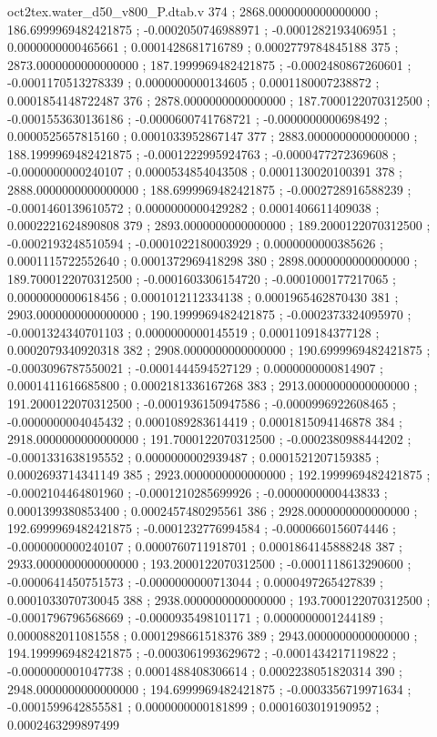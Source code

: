 \begin{filecontents}[overwrite]{oct2tex.water_d50_v800_P.dtab.v}
374 ; 2868.0000000000000000 ; 186.6999969482421875 ; -0.0002050746988971 ; -0.0001282193406951 ; 0.0000000000465661 ; 0.0001428681716789 ; 0.0002779784845188
375 ; 2873.0000000000000000 ; 187.1999969482421875 ; -0.0002480867260601 ; -0.0001170513278339 ; 0.0000000000134605 ; 0.0001180007238872 ; 0.0001854148722487
376 ; 2878.0000000000000000 ; 187.7000122070312500 ; -0.0001553630136186 ; -0.0000600741768721 ; -0.0000000000698492 ; 0.0000525657815160 ; 0.0001033952867147
377 ; 2883.0000000000000000 ; 188.1999969482421875 ; -0.0001222995924763 ; -0.0000477272369608 ; -0.0000000000240107 ; 0.0000534854043508 ; 0.0001130020100391
378 ; 2888.0000000000000000 ; 188.6999969482421875 ; -0.0002728916588239 ; -0.0001460139610572 ; 0.0000000000429282 ; 0.0001406611409038 ; 0.0002221624890808
379 ; 2893.0000000000000000 ; 189.2000122070312500 ; -0.0002193248510594 ; -0.0001022180003929 ; 0.0000000000385626 ; 0.0001115722552640 ; 0.0001372969418298
380 ; 2898.0000000000000000 ; 189.7000122070312500 ; -0.0001603306154720 ; -0.0001000177217065 ; 0.0000000000618456 ; 0.0001012112334138 ; 0.0001965462870430
381 ; 2903.0000000000000000 ; 190.1999969482421875 ; -0.0002373324095970 ; -0.0001324340701103 ; 0.0000000000145519 ; 0.0001109184377128 ; 0.0002079340920318
382 ; 2908.0000000000000000 ; 190.6999969482421875 ; -0.0003096787550021 ; -0.0001444594527129 ; 0.0000000000814907 ; 0.0001411616685800 ; 0.0002181336167268
383 ; 2913.0000000000000000 ; 191.2000122070312500 ; -0.0001936150947586 ; -0.0000996922608465 ; -0.0000000004045432 ; 0.0001089283614419 ; 0.0001815094146878
384 ; 2918.0000000000000000 ; 191.7000122070312500 ; -0.0002380988444202 ; -0.0001331638195552 ; 0.0000000002939487 ; 0.0001521207159385 ; 0.0002693714341149
385 ; 2923.0000000000000000 ; 192.1999969482421875 ; -0.0002104464801960 ; -0.0001210285699926 ; -0.0000000000443833 ; 0.0001399380853400 ; 0.0002457480295561
386 ; 2928.0000000000000000 ; 192.6999969482421875 ; -0.0001232776994584 ; -0.0000660156074446 ; -0.0000000000240107 ; 0.0000760711918701 ; 0.0001864145888248
387 ; 2933.0000000000000000 ; 193.2000122070312500 ; -0.0001118613290600 ; -0.0000641450751573 ; -0.0000000000713044 ; 0.0000497265427839 ; 0.0001033070730045
388 ; 2938.0000000000000000 ; 193.7000122070312500 ; -0.0001796796568669 ; -0.0000935498101171 ; 0.0000000001244189 ; 0.0000882011081558 ; 0.0001298661518376
389 ; 2943.0000000000000000 ; 194.1999969482421875 ; -0.0003061993629672 ; -0.0001434217119822 ; -0.0000000001047738 ; 0.0001488408306614 ; 0.0002238051820314
390 ; 2948.0000000000000000 ; 194.6999969482421875 ; -0.0003356719971634 ; -0.0001599642855581 ; 0.0000000000181899 ; 0.0001603019190952 ; 0.0002463299897499

\end{filecontents}
